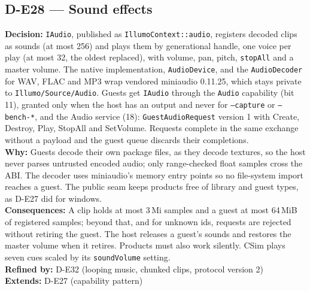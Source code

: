 \subsection*{D-E28 --- Sound effects}
\begin{decisionbox}[title={D-E28 \quad 2026-09-24}]
\textbf{Decision:} \texttt{IAudio}, published as \texttt{IllumoContext::audio},
registers decoded clips as sounds (at most 256) and plays them by
generational handle, one voice per play (at most 32, the oldest replaced),
with volume, pan, pitch, \texttt{stopAll} and a master volume. The native
implementation, \texttt{AudioDevice}, and the \texttt{AudioDecoder} for WAV,
FLAC and MP3 wrap vendored miniaudio 0.11.25, which stays private to
\texttt{Illumo/Source/Audio}. Guests get \texttt{IAudio} through the
\texttt{Audio} capability (bit 11), granted only when the host has an output
and never for \texttt{--capture} or \texttt{--bench-*}, and the Audio service
(18): \texttt{GuestAudioRequest} version 1 with Create, Destroy, Play, StopAll
and SetVolume. Requests complete in the same exchange without a payload and
the guest queue discards their completions.\\
\textbf{Why:} Guests decode their own package files, as they decode textures,
so the host never parses untrusted encoded audio; only range-checked float
samples cross the ABI. The decoder uses miniaudio's memory entry points so
no file-system import reaches a guest. The public seam keeps products free of
library and guest types, as D-E27 did for windows.\\
\textbf{Consequences:} A clip holds at most 3\,Mi samples and a guest at most
64\,MiB of registered samples; beyond that, and for unknown ids, requests are
rejected without retiring the guest. The host releases a guest's sounds and
restores the master volume when it retires. Products must also work
silently. CSim plays seven cues scaled by its \texttt{soundVolume} setting.\\
\textbf{Refined by:} D-E32 (looping music, chunked clips, protocol version 2)\\
\textbf{Extends:} D-E27 (capability pattern)
\end{decisionbox}

